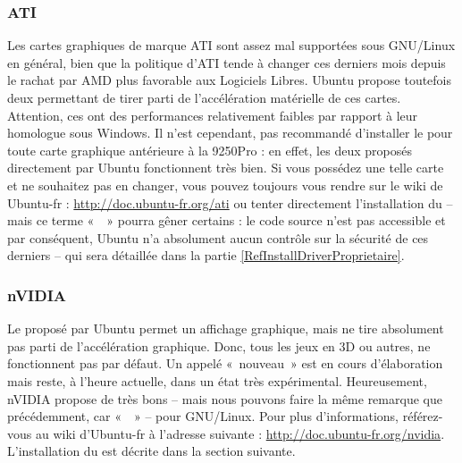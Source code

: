 \subsubsection{ATI}
Les cartes graphiques de marque ATI sont assez mal supportées sous GNU/Linux en général, bien que la politique d'ATI tende à changer ces derniers mois depuis le rachat par AMD plus favorable aux Logiciels Libres. Ubuntu propose toutefois deux  permettant de tirer parti de l'accélération matérielle de ces cartes. Attention, ces  ont des performances relativement faibles par rapport à leur homologue sous Windows. Il n'est cependant, pas recommandé d'installer le   pour toute carte graphique antérieure à la 9250Pro : en effet, les deux   proposés directement par Ubuntu fonctionnent très bien. Si vous possédez une telle carte et ne souhaitez pas en changer, vous pouvez toujours vous rendre sur le wiki de Ubuntu-fr : \url{http://doc.ubuntu-fr.org/ati} ou tenter directement l'installation du   -- mais ce terme «~~» pourra gêner certains : le code source n'est pas accessible et par conséquent, Ubuntu n'a absolument aucun contrôle sur la sécurité de ces derniers -- qui sera détaillée dans la partie \ref{RefInstallDriverProprietaire}.
\subsubsection{nVIDIA}
Le  proposé par Ubuntu permet un affichage graphique, mais ne tire absolument pas parti de l'accélération graphique. Donc, tous les jeux en 3D ou autres, ne fonctionnent pas par défaut. Un   appelé «~nouveau~» est en cours d'élaboration mais reste, à l'heure actuelle, dans un état très expérimental. Heureusement, nVIDIA propose de très bons   -- mais nous pouvons faire la même remarque que précédemment, car «~~» -- pour GNU/Linux. Pour plus d'informations, référez-vous au wiki d'Ubuntu-fr à l'adresse suivante : \url{http://doc.ubuntu-fr.org/nvidia}. L'installation du   est décrite dans la section suivante.
\newpage
